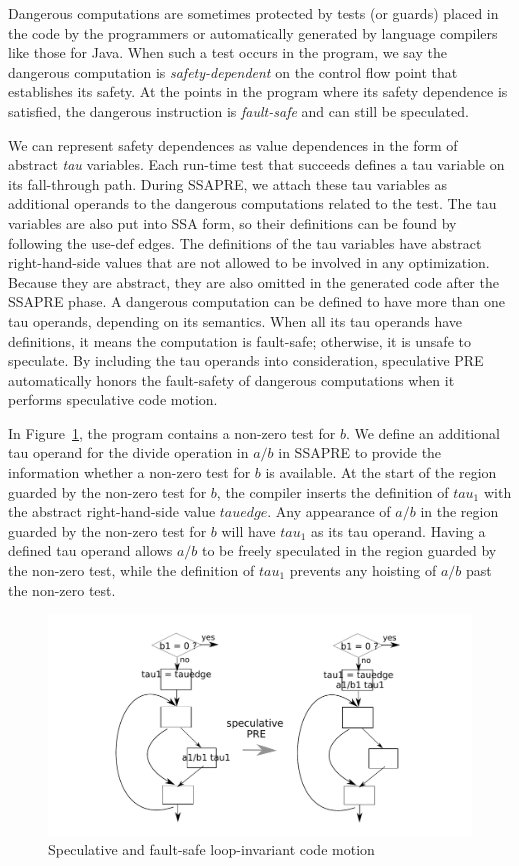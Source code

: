 Dangerous computations are sometimes protected by tests (or guards) placed in
the code by the programmers or automatically generated by language compilers
like those for Java.  When such a test occurs in the
program, we say the dangerous computation is \emph{safety-dependent} on
the control flow point that establishes its safety.  At the points in the 
program where its safety dependence is satisfied, the dangerous instruction
is \emph{fault-safe} and can still be speculated.

We can represent safety dependences as value dependences in the
form of abstract \emph{tau} variables.  Each run-time test
that succeeds defines a tau variable on its fall-through path.  During SSAPRE,
we attach these tau variables as additional operands to the
dangerous computations related to the test.  The tau variables are also 
put into SSA form, so their definitions can
be found by following the use-def edges.  The definitions of the tau variables 
have abstract right-hand-side values that are not allowed to be
involved in any optimization.  Because they are abstract, they
are also omitted in the generated code after the SSAPRE phase.  A dangerous
computation can be defined to have more than one tau operands, depending on
its semantics.  When all its tau operands have definitions, 
it means the computation is fault-safe; otherwise, it is unsafe to speculate.  
By including the tau operands into consideration, speculative PRE automatically
honors the fault-safety of dangerous computations when it performs speculative
code motion.

In Figure~\ref{fig: spec-div}, the program contains a 
non-zero test for $b$.  We define an additional tau operand
for the divide operation in $a/b$ in SSAPRE to
provide the information whether a non-zero test for $b$ is available.  
At the start of the region guarded by the non-zero test for $b$, the compiler
inserts the definition of $tau_1$ with the abstract right-hand-side value 
$tauedge$.  Any appearance of $a/b$ in the region guarded by
the non-zero test for $b$ will have $tau_1$ as its tau operand.  Having a
defined tau operand allows $a/b$ to be freely speculated in the region
guarded by the non-zero test, while the definition of $tau_1$ prevents any
hoisting of $a/b$ past the non-zero test.

\begin{figure}
\centering
\includegraphics[scale=0.55]{fig-spec-div.pdf}
\caption{Speculative and fault-safe loop-invariant code motion}
\label{fig: spec-div}
\end{figure}

